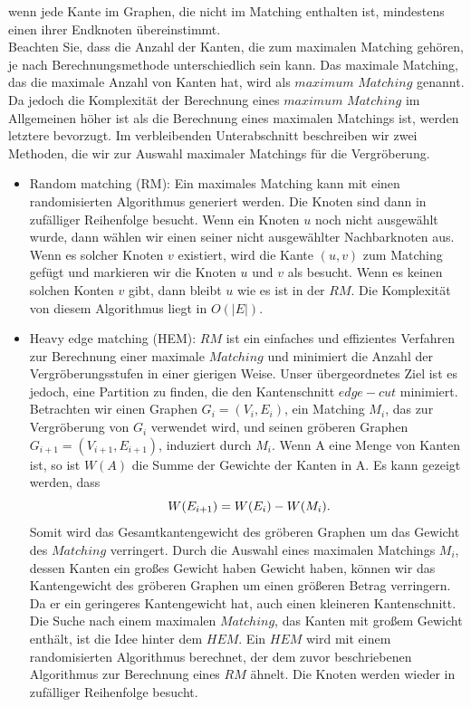 \documentclass[runningheads]{llncs}
\begin{document}
wenn jede Kante im Graphen, die nicht im Matching enthalten ist, mindestens einen ihrer Endknoten übereinstimmt.\\
 Beachten Sie, dass die Anzahl der Kanten, die zum maximalen Matching gehören, je nach Berechnungsmethode unterschiedlich sein kann. Das maximale Matching, das
die maximale Anzahl von Kanten hat, wird als $maximum$ $Matching$ genannt. Da jedoch die Komplexität der Berechnung eines $maximum$ $Matching$ im Allgemeinen höher ist als die Berechnung eines maximalen Matchings ist, werden letztere bevorzugt. Im verbleibenden Unterabschnitt beschreiben wir zwei Methoden, die wir zur Auswahl maximaler
Matchings für die Vergröberung. 
\begin{itemize}
	\item Random matching (RM): Ein maximales Matching kann mit einen randomisierten Algorithmus generiert werden. Die Knoten sind dann in  zufälliger Reihenfolge besucht. Wenn ein Knoten $u$ noch nicht ausgewählt wurde, dann wählen wir einen seiner nicht ausgewählter Nachbarknoten aus. Wenn es solcher Knoten $v$ existiert, wird die Kante $(u, v)$ zum Matching gefügt und markieren wir die Knoten $u$ und $v$ als besucht. Wenn es keinen solchen Konten $v$ gibt, dann bleibt $u$  wie es ist in der $RM$. Die Komplexität von diesem Algorithmus liegt in $O(\lvert E \lvert)$.\\[4pt]
	\item Heavy edge matching (HEM): $RM$ ist ein einfaches und effizientes Verfahren zur Berechnung einer
	maximale $Matching$ und minimiert die Anzahl der Vergröberungsstufen in einer gierigen Weise.
	Unser übergeordnetes Ziel ist es jedoch, eine Partition zu finden, die den Kantenschnitt $edge-cut$ minimiert.
	Betrachten wir
	einen Graphen $G_i = (V_i, E_i)$, ein Matching $M_i$, das zur Vergröberung von $G_i$ verwendet wird, und seinen gröberen Graphen
	$G_{i+1} = (V_{i+1}, E_{i+1})$, induziert durch $M_i$. Wenn A eine Menge von Kanten ist, so ist $W(A)$ die Summe
	der Gewichte der Kanten in A. Es kann gezeigt werden, dass
	\begin{equation} 
		\centerline{$W(E_{i+1}) = W(E_i) - W(M_i).$}
	\end{equation}
	Somit wird das Gesamtkantengewicht des gröberen Graphen um das Gewicht des $Matching$ verringert. Durch die Auswahl eines maximalen Matchings $M_i$, dessen Kanten ein großes Gewicht haben
	Gewicht haben, können wir das Kantengewicht des gröberen Graphen um einen größeren Betrag verringern. Da er ein geringeres Kantengewicht hat, auch einen kleineren Kantenschnitt. Die Suche nach einem maximalen $Matching$, das Kanten mit großem Gewicht enthält, ist die Idee hinter dem $HEM$.  Ein $HEM$ wird mit einem randomisierten Algorithmus berechnet, der dem zuvor beschriebenen Algorithmus zur Berechnung eines $RM$ ähnelt. Die Knoten werden wieder in zufälliger Reihenfolge besucht.\\

\end{itemize}
\end{document}
